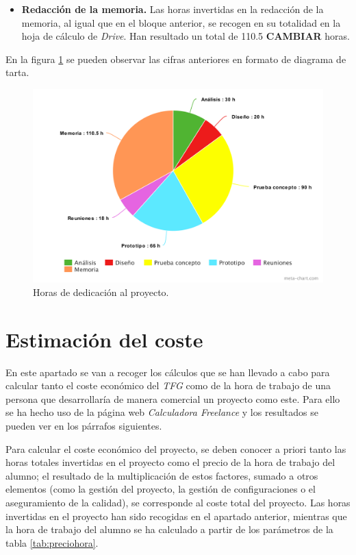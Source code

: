 \begin{itemize}
\item \textbf{Redacción de la memoria. } Las horas invertidas en la redacción de la memoria, al igual que en el bloque anterior, se recogen en su totalidad en la hoja de cálculo de \textit{Drive}. Han resultado un total de 110.5 \textbf{CAMBIAR} horas.
\end{itemize}

En la figura \ref{fig:esfuerzos} se pueden observar las cifras anteriores en formato de diagrama de tarta. 

\begin{figure}[!h]
    \centering
    \includegraphics[width=\textwidth,height=\textheight,keepaspectratio]{Imagenes/esfuerzos}
    \caption{Horas de dedicación al proyecto.}
    \label{fig:esfuerzos}
\end{figure}


\section{Estimación del coste} \label{gestion.estimacion}

En este apartado se van a recoger los cálculos que se han llevado a cabo para calcular tanto el coste económico del \textit{TFG} como de la hora de trabajo de una persona que desarrollaría de manera comercial un proyecto como este. Para ello se ha hecho uso de la página web \textit{Calculadora Freelance} \cite{calculadorafreelance} y los resultados se pueden ver en los párrafos siguientes. 
\par 
Para calcular el coste económico del proyecto, se deben conocer a priori tanto las horas totales invertidas en el proyecto como el precio de la hora de trabajo del alumno; el resultado de la multiplicación de estos factores, sumado a otros elementos (como la gestión del proyecto, la gestión de configuraciones o el aseguramiento de la calidad), se corresponde al coste total del proyecto. Las horas invertidas en el proyecto han sido recogidas en el apartado anterior, mientras que la hora de trabajo del alumno se ha calculado a partir de los parámetros de la tabla \ref{tab:preciohora}.


